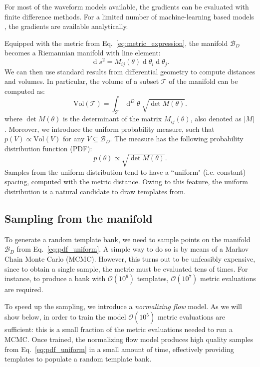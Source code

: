 \documentclass[twocolumn,showpacs,preprintnumbers,nofootinbib,prd,
superscriptaddress,10pt]{revtex4-2}
\renewcommand{\d}[1]{\ensuremath{\operatorname{d}\!{#1}}}
\newcommand{\dvol}[2]{\ensuremath{\operatorname{d}^{#2}\!{#1}}}
\begin{document}
For most of the waveform models available, the gradients can be evaluated with finite difference methods. For a limited number of machine-learning based models \cite{Chua:2018woh, Khan:2020fso, Schmidt:2020yuu, Thomas:2022rmc, Tissino:2022thn}, the gradients are available analytically.

Equipped with the metric from Eq.~\eqref{eq:metric_expression}, the manifold $\mathcal{B}_D$ becomes a Riemannian manifold with line element:
\begin{equation}\label{eq:line_element}
	\d{s^2} = M_{ij}(\theta) \d{\theta_i} \d{\theta_j}.
\end{equation}
We can then use standard results from differential geometry to compute distances and volumes. In particular, the volume of a subset $\mathcal{T}$ of the manifold can be computed as:
\begin{equation}\label{eq:volume_tile}
	\text{Vol}(\mathcal{T}) = \int_\mathcal{T} \dvol{\theta}{D} \; \sqrt{\det M(\theta)}.
\end{equation}
where $\det M(\theta)$ is the determinant of the matrix $M_{ij}(\theta)$, also denoted as $|M|$.
%
Moreover, we introduce the uniform probability measure, such that $p(V) \propto \text{Vol}(V)$ for any $V\subseteq \mathcal{B}_D$. The measure has the following probability distribution function (PDF):
\begin{equation}\label{eq:pdf_uniform}
	p(\theta) \propto \sqrt{\det M(\theta)}.
\end{equation}
Samples from the uniform distribution tend to have a ``uniform" (i.e. constant) spacing, computed with the metric distance. Owing to this feature, the uniform distribution is a natural candidate to draw templates from.

\subsection{Sampling from the manifold} \label{sec:normalizing_flow}

To generate a random template bank, we need to sample points on the manifold $\mathcal{B}_D$ from Eq.~\eqref{eq:pdf_uniform}.
A simple way to do so is by means of a Markov Chain Monte Carlo (MCMC). However, this turns out to be unfeasibly expensive, since to obtain a single sample, the metric must be evaluated tens of times. For instance, to produce a bank with $\mathcal{O}(10^6)$ templates, $\mathcal{O}(10^7)$ metric evaluations are required.

To speed up the sampling, we introduce a {\it normalizing flow} model. As we will show below, in order to train the model $\mathcal{O}(10^5)$ metric evaluations are sufficient: this is a small fraction of the metric evaluations needed to run a MCMC.
Once trained, the normalizing flow model produces high quality samples from Eq.~\eqref{eq:pdf_uniform} in a small amount of time, effectively providing templates to populate a random template bank.
\end{document}
